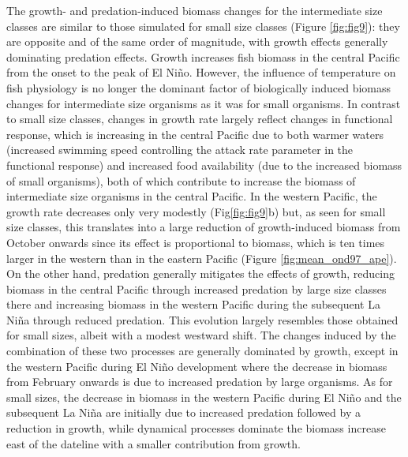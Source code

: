 The growth- and predation-induced biomass changes for the intermediate size classes are similar to those simulated for small size classes (Figure \ref{fig:fig9}): they are opposite and of the same order of magnitude, with growth effects generally dominating predation effects. Growth increases fish biomass in the central Pacific from the onset to the peak of El Niño. However, the influence of temperature on fish physiology is no longer the dominant factor of biologically induced biomass changes for intermediate size organisms as it was for small organisms. In contrast to small size classes, changes in growth rate largely reflect changes in functional response, which is increasing in the central Pacific due to both warmer waters (increased swimming speed controlling the attack rate parameter in the functional response) and increased food availability (due to the increased biomass of small organisms), both of which contribute to increase the biomass of intermediate size organisms in the central Pacific. In the western Pacific, the growth rate decreases only very modestly (Fig\ref{fig:fig9}b) but, as seen for small size classes, this translates into a large reduction of growth-induced biomass from October onwards since its effect is proportional to biomass, which is ten times larger in the western than in the eastern Pacific (Figure \ref{fig:mean_ond97_ape}).
On the other hand, predation generally mitigates the effects of growth, reducing biomass in the central Pacific through increased predation by large size classes there and increasing biomass in the western Pacific during the subsequent La Niña through reduced predation. This evolution largely resembles those obtained for small sizes, albeit with a modest westward shift. The changes induced by the combination of these two processes are generally dominated by growth, except in the western Pacific during El Niño development where the  decrease in biomass from February onwards is due to increased predation by large organisms. As for small sizes, the decrease in biomass in the western Pacific during El Niño and the subsequent La Niña are initially due to increased predation followed by a reduction in growth, while dynamical processes dominate the biomass increase east of the dateline with a smaller contribution from growth.

